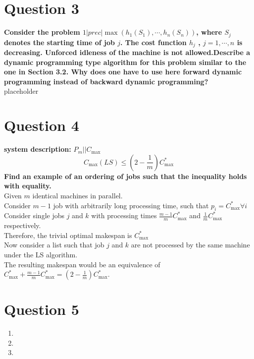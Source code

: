 \documentclass[a4paper, fleqn]{article}
\begin{document}
\section{Question 3}
\textbf{Consider the problem $1|prec| \max(h_1(S_1),\cdots , h_n(S_n))$, where $S_j$ denotes the starting time of job $j$. The cost function $h_j$ , $j = 1,\cdots,n$ is decreasing. Unforced idleness of the machine is not allowed.Describe a dynamic programming type algorithm for this problem similar to the one in Section 3.2. Why does one have to use here forward dynamic
programming instead of backward dynamic programming?}\\
placeholder
\section{Question 4}
\textbf{system description: }$P_m||C_{\max}$\\
$$
C_{\max}(LS)\leq\left(2-\frac{1}{m}\right)C_{\max}^*
$$
\textbf{Find an example of an ordering of jobs such that the inequality holds with equality.}\\
Given $m$ identical machines in parallel.\\
Consider $m-1$ job with arbitrarily long processing time, such that $p_i=C_{\max}^*\forall i$\\
Consider single jobs $j$ and $k$ with processing times $\frac{m-1}{m}C_{\max}^*$ and $\frac{1}{m}C_{\max}^*$ respectively.\\
Therefore, the trivial optimal makespan is $C_{\max}^*$\\
Now consider a list such that job $j$ and $k$ are not processed by the same machine under the LS algorithm.\\
The resulting makespan would be an equivalence of\\ $C_{\max}^*+\frac{m-1}{m}C_{\max}^*=\left(2-\frac{1}{m}\right)C_{\max}^*$.
\section{Question 5}
\begin{enumerate}[label=(\alph{*})]
\item
\item 
\item 
\end{enumerate}
\end{document}
